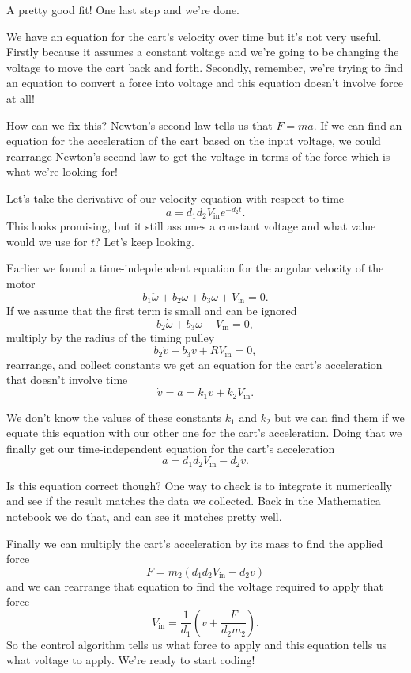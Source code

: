 \documentclass{article}
\begin{document}
A pretty good fit! One last step and we're done.

We have an equation for the cart's velocity over time but it's not very useful. Firstly because it assumes a constant voltage and we're going to be changing the voltage to move the cart back and forth. Secondly, remember, we're trying to find an equation to convert a force into voltage and this equation doesn't involve force at all!

How can we fix this? Newton's second law tells us that $F = m a$. If we can find an equation for the acceleration of the cart based on the input voltage, we could rearrange Newton's second law to get the voltage in terms of the force which is what we're looking for!

Let's take the derivative of our velocity equation with respect to time \[a = d_1 d_2 V_\text{in} e^{-d_2 t}.\] This looks promising, but it still assumes a constant voltage and what value would we use for $t$? Let's keep looking.

Earlier we found a time-indepdendent equation for the angular velocity of the motor \[b_1 \ddot{\omega} + b_2 \dot{\omega} + b_3 \omega + V_\text{in} = 0.\] If we assume that the first term is small and can be ignored \[b_2 \dot{\omega} + b_3 \omega + V_\text{in} = 0,\] multiply by the radius of the timing pulley \[b_2 \dot{v} + b_3 v + R V_\text{in} = 0,\] rearrange, and collect constants we get an equation for the cart's acceleration that doesn't involve time \[\dot{v} = a = k_1 v + k_2 V_\text{in}.\]

We don't know the values of these constants $k_1$ and $k_2$ but we can find them if we equate this equation with our other one for the cart's acceleration. Doing that we finally get our time-independent equation for the cart's acceleration \[a = d_1 d_2 V_\text{in} - d_2 v.\]

Is this equation correct though? One way to check is to integrate it numerically and see if the result matches the data we collected. Back in the Mathematica notebook we do that, and can see it matches pretty well.

Finally we can multiply the cart's acceleration by its mass to find the applied force \[F = m_2 (d_1 d_2 V_\text{in} - d_2 v)\] and we can rearrange that equation to find the voltage required to apply that force \[V_\text{in} = \frac{1}{d_1} \left( v + \frac{F}{d_2 m_2} \right).\] So the control algorithm tells us what force to apply and this equation tells us what voltage to apply. We're ready to start coding!
\end{document}
